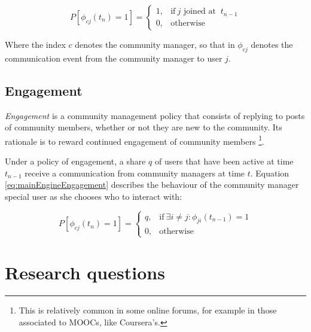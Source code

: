 \documentclass{article}
\begin{document}
\begin{equation}
	P [\phi_{cj}(t_n) = 1] = 
	\begin{cases}
		1, & \text{if}\ j \text{ joined at } \ t_{n-1} \\
		0, & \text{otherwise}
	\end{cases}
	\label{eq:mainEngineOnboarding}
\end{equation}

Where the index $c$ denotes the community manager, so that in $\phi_{cj}$ denotes the communication event from the community manager to user $j$.

\subsection{Engagement}

\textit{Engagement} is a community management policy that consists of replying to posts of community members, whether or not they are new to the community. Its rationale is to reward continued engagement of community members \footnote{This is relatively common in some online forums, for example in those associated to MOOCs, like Coursera's.}.  

Under a policy of engagement, a share $q$ of users that have been active at time $t_{n-1}$ receive a communication from community managers at time $t$. Equation \ref{eq:mainEngineEngagement}  describes the behaviour of the community manager special user as she chooses who to interact with: 

\begin{equation}
	P [\phi_{cj}(t_n) = 1] = 
	\begin{cases}
		q, & \text{if}\ \exists i \neq j : \phi_{ji}(t_{n-1}) =1 \\
		0, & \text{otherwise}
	\end{cases}
	\label{eq:mainEngineEngagement}
\end{equation}

\section{Research questions}
\end{document}
